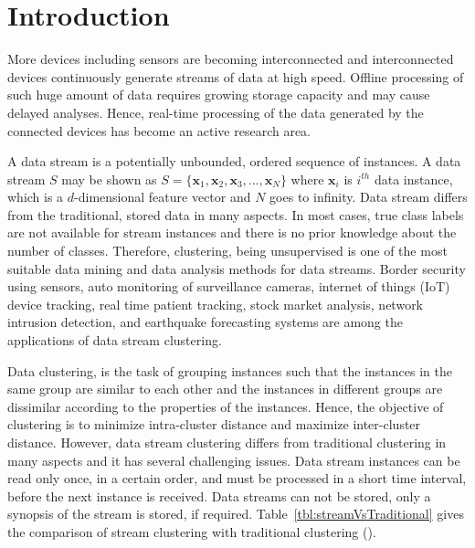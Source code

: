 \documentclass[smallcondensed]{svjour3}     %
\begin{document}


%
\section{Introduction}
More devices including sensors are becoming interconnected and interconnected devices continuously generate streams of data at high speed. Offline processing of such huge amount of data requires growing storage capacity and may cause delayed analyses. Hence, real-time processing of the data generated by the connected devices has become an active research area. 

A data stream is a potentially unbounded, ordered sequence of instances. A data stream $S$ may be shown as $S = \{\textbf{x}_1, \textbf{x}_2, \textbf{x}_3, ..., \textbf{x}_N\}$ where $\textbf{x}_i$ is $i^{th}$ data instance, which is a $d$-dimensional feature vector and $N$ goes to infinity. Data stream differs from the traditional, stored data in many aspects. In most cases, true class labels are not available for stream instances and there is no prior knowledge about the number of classes. Therefore, clustering, being unsupervised is one of the most suitable data mining and data analysis methods for data streams. Border security using sensors, auto monitoring of surveillance cameras, internet of things (IoT) device tracking, real time patient tracking, stock market analysis, network intrusion detection, and earthquake forecasting systems are among the applications of data stream clustering.

Data clustering, is the task of grouping instances such that the instances in the same group are similar to each other and the instances in different groups are dissimilar according to the properties of the instances. Hence, the objective of clustering is to minimize intra-cluster distance and maximize inter-cluster distance. 
However, data stream clustering differs from traditional clustering in many aspects and it has several challenging issues. Data stream instances can be read only once, in a certain order, and must be processed in a short time interval, before the next instance is received. Data streams can not be stored, only a synopsis of the stream is stored, if required. 
Table~\ref{tbl:streamVsTraditional} gives the comparison of stream clustering with traditional clustering (\cite{Mousavi:2015:review, gaber2009data}).
\end{document}
